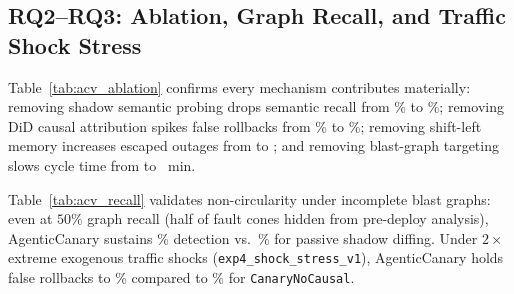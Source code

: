 

\subsection{RQ2--RQ3: Ablation, Graph Recall, and Traffic Shock Stress}
Table~\ref{tab:acv_ablation} confirms every mechanism contributes materially: removing shadow semantic probing drops semantic recall from \ACSemPct{}\% to \AblNoShadowSemPct{}\%; removing DiD causal attribution spikes false rollbacks from \ACFalseRollPct{}\% to \AblNoCausalFRPct{}\%; removing shift-left memory increases escaped outages from \ACEscapes{} to \AblNoShiftEscapes{}; and removing blast-graph targeting slows cycle time from \ACCycleMin{} to \AblNoBlastCycle{}~min.

Table~\ref{tab:acv_recall} validates non-circularity under incomplete blast graphs: even at $50\%$ graph recall (half of fault cones hidden from pre-deploy analysis), AgenticCanary sustains \RecallFiftyACDetPct{}\% detection vs.\ \RecallFiftyShadowDetPct{}\% for passive shadow diffing. Under $2\times$ extreme exogenous traffic shocks (\texttt{exp4\_shock\_stress\_v1}), AgenticCanary holds false rollbacks to \ShockTwoACFRPct{}\% compared to \ShockTwoNoCausalFRPct{}\% for \texttt{CanaryNoCausal}.


